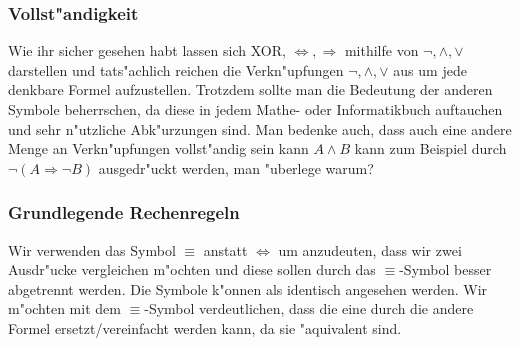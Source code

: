\subsubsection{Vollst"andigkeit}
Wie ihr sicher gesehen habt lassen sich XOR, $\iff, \Rightarrow$ mithilfe von $\neg, \land, \lor$ darstellen und tats"achlich reichen die Verkn"upfungen $\neg, \land, \lor$ aus um jede denkbare Formel aufzustellen. Trotzdem sollte man die Bedeutung der anderen Symbole beherrschen, da diese in jedem Mathe- oder Informatikbuch auftauchen und sehr n"utzliche Abk"urzungen sind. Man bedenke auch, dass auch eine andere Menge an Verkn"upfungen vollst"andig sein kann $A \land B$ kann zum Beispiel durch $\neg (A \Rightarrow \neg B)$ ausgedr"uckt werden, man "uberlege warum?

\subsubsection{Grundlegende Rechenregeln}
Wir verwenden das Symbol $\equiv$ anstatt $\iff$ um anzudeuten, dass wir zwei Ausdr"ucke vergleichen m"ochten und diese sollen durch das $\equiv$-Symbol besser abgetrennt werden. Die Symbole k"onnen als identisch angesehen werden. Wir m"ochten mit dem $\equiv$-Symbol verdeutlichen, dass die eine durch die andere Formel ersetzt/vereinfacht werden kann, da sie "aquivalent sind.
